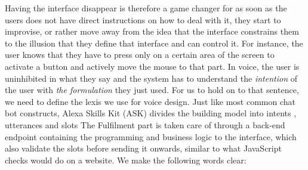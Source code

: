 Having the interface disappear is therefore a game changer for as soon as the users does not have direct instructions on how to deal with it, they start to improvise, or rather move away from the idea that the interface constrains them to the illusion that they define that interface and can control it. For instance, the user knows that they have to press only on a certain area of the screen to activate a button and actively move the mouse to that part. In voice, the user is uninhibited in what they say and the system has to understand the \textit{intention}%
of the user with \textit{the formulation}%
 they just used. 
For us to hold on to that sentence, we need to define the lexis we use for voice design. 
Just like most common chat bot constructs, Alexa Skills Kit (ASK) divides the building model into intents%
, utterances%
and slots %
The Fulfilment part is taken care of through a back-end endpoint containing the programming and business logic to the interface, which also validate the slots before sending it onwards, similar to what JavaScript checks would do on a website. We make the following words clear:


